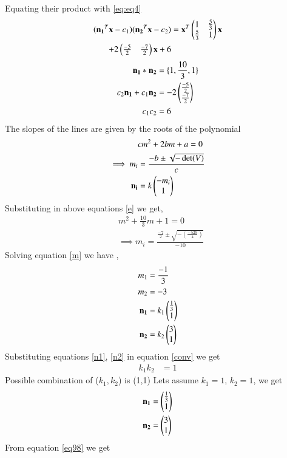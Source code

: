 \documentclass[journal,12pt,twocolumn]{IEEEtran}
\begin{document}
Equating their product with \eqref{eq:eq4}
\begin{align}
(\mathbf{n_1}^T\mathbf{x}-c_1)(\mathbf{n_2}^T\mathbf{x}-c_2) &=\mathbf{x}^T\begin{pmatrix}1 & \frac{5}{3} \\\frac{5}{3} & 1\end{pmatrix}\mathbf{x}\notag\\
+2\begin{pmatrix}\frac{-5}{2} & \frac{-7}{2}\end{pmatrix}\mathbf{x}+6\label{86}
\end{align}
\begin{align}
    \mathbf{n_1}*\mathbf{n_2}&=\{1,\frac{10}{3},1\}\label{conv}\\
    c_2\mathbf{n_1}+c_1\mathbf{n_2}&=-2\begin{pmatrix}\frac{-5}{2}\\\frac{-7}{2}\end{pmatrix}\label{eq98}\\
    c_1c_2&=6
\end{align}
The slopes of the lines are given by the roots of the polynomial 
\begin{align}
    &cm^2+2bm+a=0\label{e}\\
    \implies m_i&=\frac{-b\pm{\sqrt{-\det(V)}}}{c}\\
    \mathbf{n_i}&=k\begin{pmatrix}-m_i\\1\end{pmatrix}
\end{align}
Substituting  in above equations \eqref{e} we get,
\begin{align}
    &m^2+\frac{10}{3}m+1=0\\
    &\implies m_i=\frac{\frac{-7}{2}\pm{\sqrt{-(\frac{-529}{4})}}}{-10}\label{m}
\end{align}
Solving equation \eqref{m} we have ,
\begin{align}
    m_1&=\frac{-1}{3}\\
    m_2&=-3\\
    \mathbf{n_1}&=k_1\begin{pmatrix}\frac{1}{3}\\1\end{pmatrix}\label{n1}\\
    \mathbf{n_2}&=k_2\begin{pmatrix}{3}\\1\end{pmatrix}\label{n2}
\end{align}
Substituting equations \eqref{n1}, \eqref{n2} in equation \eqref{conv} we get 
\begin{align}
    k_1k_2&=1
\end{align}
Possible combination of ($k_1,k_2$) is (1,1)
Lets assume $k_1=1$, $k_2=1$, we get 
\begin{align}
    \mathbf{n_1}&=\begin{pmatrix}\frac{1}{3} \\1\end{pmatrix}\label{n11}\\
    \mathbf{n_2}&=\begin{pmatrix}3\\1\end{pmatrix}\label{n22}
\end{align}
From equation \eqref{eq98} we get 
\end{document}
